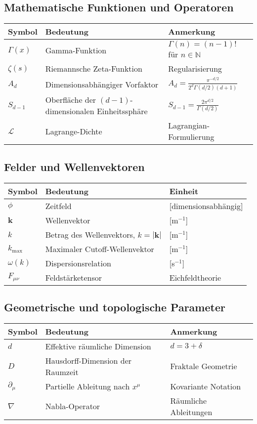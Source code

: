 \documentclass[12pt,a4paper]{article}
\begin{document}
	\subsection{Mathematische Funktionen und Operatoren}
	\begin{longtable}{p{2.5cm} p{10cm} p{3cm}}
		\toprule
		\textbf{Symbol} & \textbf{Bedeutung} & \textbf{Anmerkung} \\
		\midrule
		$\Gamma(x)$ & Gamma-Funktion & $\Gamma(n) = (n-1)!$ für $n \in \mathbb{N}$ \\
		$\zeta(s)$ & Riemannsche Zeta-Funktion & Regularisierung \\
		$A_d$ & Dimensionsabhängiger Vorfaktor & $A_d = \frac{\pi^{-d/2}}{2^d\Gamma(d/2)(d+1)}$ \\
		$S_{d-1}$ & Oberfläche der $(d-1)$-dimensionalen Einheitssphäre & $S_{d-1} = \frac{2\pi^{d/2}}{\Gamma(d/2)}$ \\
		$\mathcal{L}$ & Lagrange-Dichte & Lagrangian-Formulierung \\
		\bottomrule
	\end{longtable}
	
	\subsection{Felder und Wellenvektoren}
	\begin{longtable}{p{2.5cm} p{10cm} p{3cm}}
		\toprule
		\textbf{Symbol} & \textbf{Bedeutung} & \textbf{Einheit} \\
		\midrule
		$\phi$ & Zeitfeld & [dimensionsabhängig] \\
		$\mathbf{k}$ & Wellenvektor & [m$^{-1}$] \\
		$k$ & Betrag des Wellenvektors, $k = |\mathbf{k}|$ & [m$^{-1}$] \\
		$k_{\max}$ & Maximaler Cutoff-Wellenvektor & [m$^{-1}$] \\
		$\omega(k)$ & Dispersionsrelation & [s$^{-1}$] \\
		$F_{\mu\nu}$ & Feldstärketensor & Eichfeldtheorie \\
		\bottomrule
	\end{longtable}
	
	\subsection{Geometrische und topologische Parameter}
	\begin{longtable}{p{2.5cm} p{10cm} p{3cm}}
		\toprule
		\textbf{Symbol} & \textbf{Bedeutung} & \textbf{Anmerkung} \\
		\midrule
		$d$ & Effektive räumliche Dimension & $d = 3 + \delta$ \\
		$D$ & Hausdorff-Dimension der Raumzeit & Fraktale Geometrie \\
		$\partial_\mu$ & Partielle Ableitung nach $x^\mu$ & Kovariante Notation \\
		$\nabla$ & Nabla-Operator & Räumliche Ableitungen \\
		\bottomrule
	\end{longtable}
	
\end{document}
